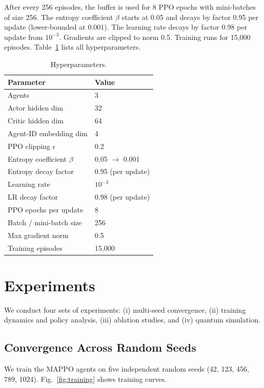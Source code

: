 \documentclass[journal]{IEEEtran}
\begin{document}
After every 256 episodes, the buffer is used for 8 PPO epochs with mini-batches of size 256. The entropy coefficient $\beta$ starts at 0.05 and decays by factor 0.95 per update (lower-bounded at 0.001). The learning rate decays by factor 0.98 per update from $10^{-3}$. Gradients are clipped to norm 0.5. Training runs for 15,000 episodes. Table~\ref{tab:hyper} lists all hyperparameters.

\begin{table}[!t]
\centering
\caption{Hyperparameters.\label{tab:hyper}}
\begin{tabular}{@{}ll@{}}
\toprule
\textbf{Parameter} & \textbf{Value} \\
\midrule
Agents                  & 3 \\
Actor hidden dim        & 32 \\
Critic hidden dim       & 64 \\
Agent-ID embedding dim  & 4 \\
PPO clipping $\epsilon$ & 0.2 \\
Entropy coefficient $\beta$ & 0.05 $\to$ 0.001 \\
Entropy decay factor    & 0.95 (per update) \\
Learning rate           & $10^{-3}$ \\
LR decay factor         & 0.98 (per update) \\
PPO epochs per update   & 8 \\
Batch / mini-batch size & 256 \\
Max gradient norm       & 0.5 \\
Training episodes       & 15,000 \\
\bottomrule
\end{tabular}
\end{table}

\section{Experiments}

We conduct four sets of experiments: (i) multi-seed convergence, (ii) training dynamics and policy analysis, (iii) ablation studies, and (iv) quantum simulation.

\subsection{Convergence Across Random Seeds}

We train the MAPPO agents on five independent random seeds (42, 123, 456, 789, 1024). Fig.~\ref{fig:training} shows training curves.
\end{document}
